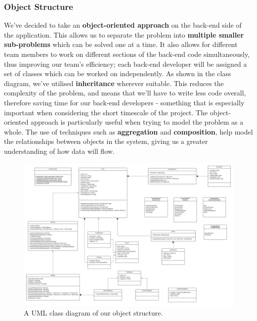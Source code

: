 \documentclass[10pt]{article}
\begin{document}
\subsubsection{Object Structure}
We've decided to take an \textbf{object-oriented approach} on the back-end side
of the application. This allows us to separate the problem into \textbf{multiple
smaller sub-problems} which can be solved one at a time. It also allows for
different team members to work on different sections of the back-end code
simultaneously, thus improving our team's efficiency; each back-end developer
will be assigned a set of classes which can be worked on independently. As shown
in the class diagram, we've utilised \textbf{inheritance} wherever suitable.
This reduces the complexity of the problem, and means that we'll have to write
less code overall, therefore saving time for our back-end developers - something
that is especially important when considering the short timescale of the
project. The object-oriented approach is particularly useful when trying to
model the problem as a whole. The use of techniques such as \textbf{aggregation}
and \textbf{composition}, help model the relationships between objects in the
system, giving us a greater understanding of how data will flow.

\begin{figure}[H]
    \centering
    \includegraphics[width=1\textwidth]{Objects}
    \caption{A UML class diagram of our object structure.}
    \label{fig:uml_class_diagram}
\end{figure}
\end{document}
